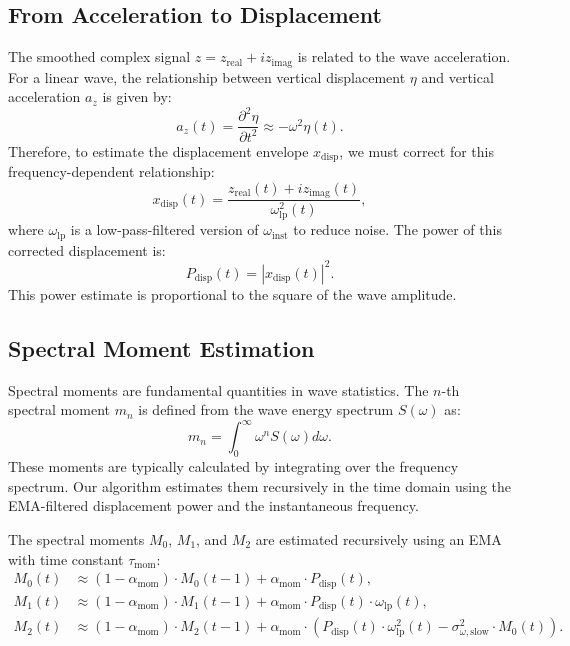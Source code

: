 \documentclass[11pt]{article}
\begin{document}
\subsection{From Acceleration to Displacement}
The smoothed complex signal $z = z_{\text{real}} + i z_{\text{imag}}$ is related to the wave acceleration. For a linear wave, the relationship between vertical displacement $\eta$ and vertical acceleration $a_z$ is given by:
\begin{equation}
a_z(t) = \frac{\partial^2 \eta}{\partial t^2} \approx -\omega^2 \eta(t).
\end{equation}
Therefore, to estimate the displacement envelope $x_{\text{disp}}$, we must correct for this frequency-dependent relationship:
\begin{equation}
x_{\text{disp}}(t) = \frac{z_{\text{real}}(t) + i z_{\text{imag}}(t)}{\omega_{\text{lp}}^2(t)},
\end{equation}
where $\omega_{\text{lp}}$ is a low-pass-filtered version of $\omega_{\text{inst}}$ to reduce noise. The power of this corrected displacement is:
\begin{equation}
P_{\text{disp}}(t) = |x_{\text{disp}}(t)|^2.
\end{equation}
This power estimate is proportional to the square of the wave amplitude.

\subsection{Spectral Moment Estimation}
Spectral moments are fundamental quantities in wave statistics. The $n$-th spectral moment $m_n$ is defined from the wave energy spectrum $S(\omega)$ as:
\begin{equation}
m_n = \int_0^{\infty} \omega^n S(\omega) d\omega.
\end{equation}
These moments are typically calculated by integrating over the frequency spectrum. Our algorithm estimates them recursively in the time domain using the EMA-filtered displacement power and the instantaneous frequency.

The spectral moments $M_0$, $M_1$, and $M_2$ are estimated recursively using an EMA with time constant $\tau_{\text{mom}}$:
\begin{align}
M_0(t) &\approx (1 - \alpha_{\text{mom}}) \cdot M_0(t-1) + \alpha_{\text{mom}} \cdot P_{\text{disp}}(t), \\
M_1(t) &\approx (1 - \alpha_{\text{mom}}) \cdot M_1(t-1) + \alpha_{\text{mom}} \cdot P_{\text{disp}}(t) \cdot \omega_{\text{lp}}(t), \\
M_2(t) &\approx (1 - \alpha_{\text{mom}}) \cdot M_2(t-1) + \alpha_{\text{mom}} \cdot \left( P_{\text{disp}}(t) \cdot \omega_{\text{lp}}^2(t) - \sigma^2_{\omega,\text{slow}} \cdot M_0(t) \right).
\end{align}
\end{document}
